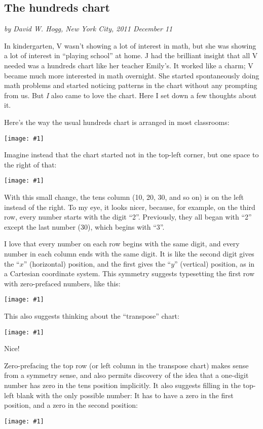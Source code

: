 \documentclass[12pt,pdftex]{article}
\newcommand{\showchart}[1]{\texttt{[image: \#1]}}
\begin{document}
\subsection*{The hundreds chart}

\noindent
\textsl{by David W. Hogg, New York City, 2011 December 11}
\vspace{1ex}

In kindergarten, V wasn't showing a lot of interest in math, but she
was showing a lot of interest in ``playing school'' at home.  J had
the brilliant insight that all V needed was a hundreds chart like her
teacher Emily's.  It worked like a charm; V became much more
interested in math overnight.  She started spontaneously doing math
problems and started noticing patterns in the chart without any
prompting from us.  But \emph{I} also came to love the chart.  Here I
set down a few thoughts about it.

Here's the way the usual hundreds chart is arranged in most
classrooms:
\begin{center}
\showchart{hundreds_chart_standard.pdf}
\end{center}

Imagine instead that the chart started not in the top-left corner,
but one space to the right of that:
\begin{center}
\showchart{hundreds_chart_skipzero_nzp.pdf}
\end{center}
With this small change, the tens column (10, 20, 30, and so on) is on
the left instead of the right.  To my eye, it looks nicer, because,
for example, on the third row, every number starts with the digit
``2''.  Previously, they all began with ``2'' except the last number
(30), which begins with ``3''.

I love that every number on each row begins with the same digit, and
every number in each column ends with the same digit.  It is like the
second digit gives the ``$x$'' (horizontal) position, and the first
gives the ``$y$'' (vertical) position, as in a Cartesian coordinate
system.  This symmetry suggests typesetting the first row with
zero-prefaced numbers, like this:
\begin{center}
\showchart{hundreds_chart_skipzero.pdf}
\end{center}
This also suggests thinking about the ``transpose'' chart:
\begin{center}
\showchart{hundreds_chart_transpose_skipzero.pdf}
\end{center}
Nice!

Zero-prefacing the top row (or left column in the transpose chart)
makes sense from a symmetry sense, and also permits discovery of the
idea that a one-digit number has zero in the tens position implicitly.
It also suggests filling in the top-left blank with the only possible
number: It has to have a zero in the first position, and a zero in the
second position:
\begin{center}
\showchart{hundreds_chart_default.pdf}
\end{center}
\end{document}
